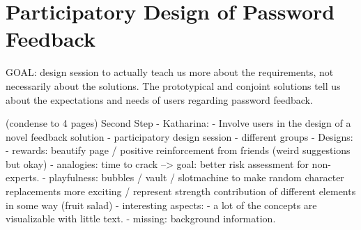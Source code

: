 
%
		
\section{Participatory Design of Password Feedback}
GOAL: design session to actually teach us more about the requirements, not necessarily about the solutions. The prototypical and conjoint solutions tell us about the expectations and needs of users regarding password feedback. 

(condense to 4 pages)
Second Step - Katharina: 
- Involve users in the design of a novel feedback solution
	- participatory design session
	- different groups
- Designs:
	- rewards: beautify page / positive reinforcement from friends (weird suggestions but okay)
	- analogies: time to crack --> goal: better risk assessment for non-experts.
	- playfulness: bubbles / vault / slotmachine to make random character replacements more exciting / represent strength contribution of different elements in some way (fruit salad)
- interesting aspects:
	- a lot of the concepts are visualizable with little text.
	- missing: background information.
	
